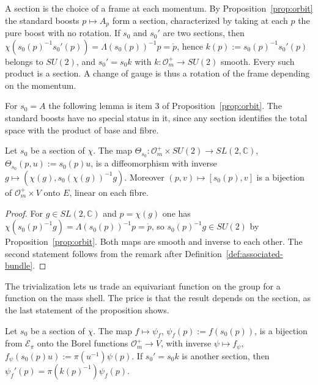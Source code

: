 \begin{remark}
	A section is the choice of a frame at each momentum. By Proposition~\ref{prop:orbit} the standard boosts $p\mapsto A_p$ form a section, characterized by taking at each $p$ the pure boost with no rotation. If $s_0$ and $s_0'$ are two sections, then $\chi(s_0(p)^{-1}s_0'(p))=\Lambda(s_0(p))^{-1}p=\mathring{p}$, hence $k(p):=s_0(p)^{-1}s_0'(p)$ belongs to $SU(2)$, and $s_0'=s_0k$ with $k:\mathcal{O}_m^+\to SU(2)$ smooth. Every such product is a section. A change of gauge is thus a rotation of the frame depending on the momentum.
\end{remark}

For $s_0=A$ the following lemma is item 3 of Proposition~\ref{prop:orbit}. The standard boosts have no special status in it, since any section identifies the total space with the product of base and fibre.

\begin{lemma}[Trivialization]\label{lem:trivialization}
	Let $s_0$ be a section of $\chi$. The map $\Theta_{s_0}:\mathcal{O}_m^+\times SU(2)\to SL(2,\mathbb{C})$, $\Theta_{s_0}(p,u):=s_0(p)u$, is a diffeomorphism with inverse $g\mapsto(\chi(g),s_0(\chi(g))^{-1}g)$. Moreover $(p,v)\mapsto[s_0(p),v]$ is a bijection of $\mathcal{O}_m^+\times V$ onto $E$, linear on each fibre.
\end{lemma}

\begin{proof}
	For $g\in SL(2,\mathbb{C})$ and $p=\chi(g)$ one has $\chi(s_0(p)^{-1}g)=\Lambda(s_0(p))^{-1}p=\mathring{p}$, so $s_0(p)^{-1}g\in SU(2)$ by Proposition~\ref{prop:orbit}. Both maps are smooth and inverse to each other. The second statement follows from the remark after Definition~\ref{def:associated-bundle}.
\end{proof}

The trivialization lets us trade an equivariant function on the group for a function on the mass shell. The price is that the result depends on the section, as the last statement of the proposition shows.

\begin{proposition}\label{prop:equivariant-base}
	Let $s_0$ be a section of $\chi$. The map $f\mapsto\psi_f$, $\psi_f(p):=f(s_0(p))$, is a bijection from $\mathcal{E}_\pi$ onto the Borel functions $\mathcal{O}_m^+\to V$, with inverse $\psi\mapsto f_\psi$, $f_\psi(s_0(p)u):=\pi(u^{-1})\psi(p)$. If $s_0'=s_0k$ is another section, then $\psi_f'(p)=\pi(k(p)^{-1})\psi_f(p)$.
\end{proposition}

